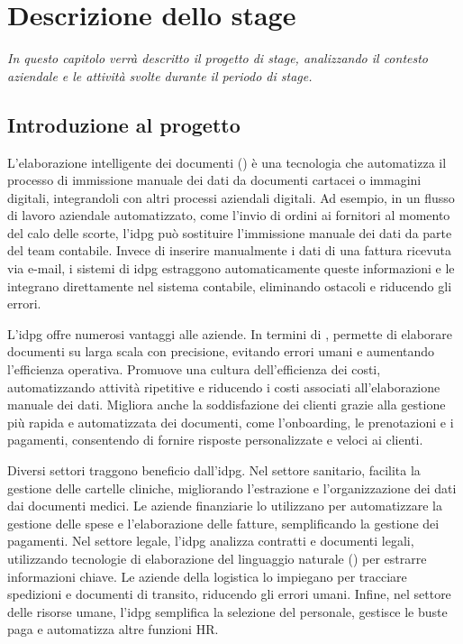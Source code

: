\chapter{Descrizione dello stage}
\label{cap:descrizione-stage}

\emph{In questo capitolo verrà descritto il progetto di stage, analizzando il contesto aziendale e le attività svolte durante il periodo di stage.}

\section{Introduzione al progetto}

L'elaborazione intelligente dei documenti () è una tecnologia che automatizza il processo di immissione manuale dei dati da documenti cartacei o immagini digitali, integrandoli con altri processi aziendali digitali. Ad esempio, in un flusso di lavoro aziendale automatizzato, come l'invio di ordini ai fornitori al momento del calo delle scorte, l'\gls{idpg} può sostituire l'immissione manuale dei dati da parte del team contabile. Invece di inserire manualmente i dati di una fattura ricevuta via e-mail, i sistemi di \gls{idpg} estraggono automaticamente queste informazioni e le integrano direttamente nel sistema contabile, eliminando ostacoli e riducendo gli errori.

L'\gls{idpg} offre numerosi vantaggi alle aziende. In termini di , permette di elaborare documenti su larga scala con precisione, evitando errori umani e aumentando l'efficienza operativa. Promuove una cultura dell'efficienza dei costi, automatizzando attività ripetitive e riducendo i costi associati all'elaborazione manuale dei dati. Migliora anche la soddisfazione dei clienti grazie alla gestione più rapida e automatizzata dei documenti, come l'onboarding, le prenotazioni e i pagamenti, consentendo di fornire risposte personalizzate e veloci ai clienti.

Diversi settori traggono beneficio dall'\gls{idpg}. Nel settore sanitario, facilita la gestione delle cartelle cliniche, migliorando l'estrazione e l'organizzazione dei dati dai documenti medici. Le aziende finanziarie lo utilizzano per automatizzare la gestione delle spese e l'elaborazione delle fatture, semplificando la gestione dei pagamenti. Nel settore legale, l'\gls{idpg} analizza contratti e documenti legali, utilizzando tecnologie di elaborazione del linguaggio naturale () per estrarre informazioni chiave. Le aziende della logistica lo impiegano per tracciare spedizioni e documenti di transito, riducendo gli errori umani. Infine, nel settore delle risorse umane, l'\gls{idpg} semplifica la selezione del personale, gestisce le buste paga e automatizza altre funzioni HR.

